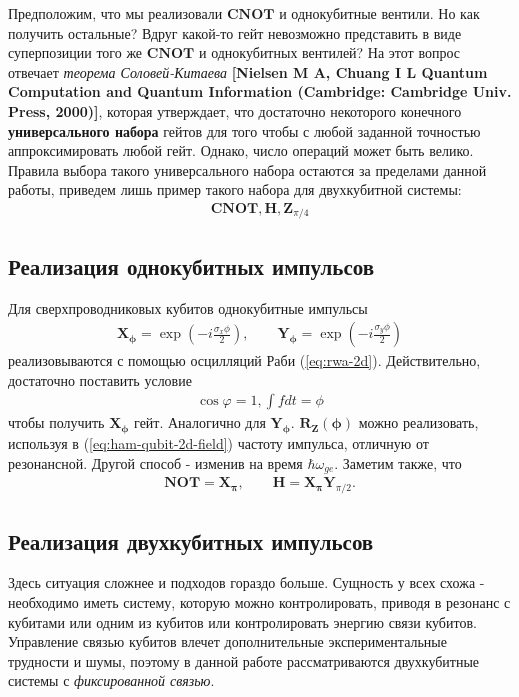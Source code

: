 \documentclass[12pt, twoside]{report}
\numberwithin{equation}{section}
\numberwithin{figure}{section}
\begin{document}
\newline
Предположим, что мы реализовали $\mathbf{CNOT}$ и однокубитные вентили. Но как получить остальные? Вдруг какой-то гейт невозможно представить в виде суперпозиции того же $\mathbf{CNOT}$ и однокубитных вентилей? На этот вопрос отвечает \textit{ теорема Соловей-Китаева} \textbf{[Nielsen M A, Chuang I L Quantum Computation and Quantum Information (Cambridge: Cambridge Univ. Press, 2000)]}, которая утверждает, что достаточно некоторого конечного \textbf{универсального набора} гейтов для того чтобы с любой заданной точностью аппроксимировать любой гейт. Однако, число операций может быть велико. Правила выбора такого универсального набора остаются за пределами данной работы, приведем лишь пример такого набора для двухкубитной системы: 
\begin{gather}
\mathbf{CNOT}, \mathbf{H}, \mathbf{Z}_{\pi/4}
\label{eq:universal-set} 
\end{gather}
\subsection{Реализация однокубитных импульсов}
Для сверхпроводниковых кубитов однокубитные импульсы 
\begin{gather}
\mathbf{X_\phi} = 
\exp \left(-i \frac{\sigma_x \phi}{2} \right), \quad \quad
\mathbf{Y_\phi} = 
\exp \left(-i \frac{\sigma_y \phi}{2} \right)
\end{gather}
реализовываются с помощью осцилляций Раби (\ref{eq:rwa-2d}). Действительно, достаточно поставить условие
\begin{gather*}
\cos \varphi = 1, \int f dt = \phi
\end{gather*}
чтобы получить $\mathbf{X_\phi}$ гейт. Аналогично для $\mathbf{Y_\phi}$.
$\mathbf{R_Z(\phi)}$ можно реализовать, используя в (\ref{eq:ham-qubit-2d-field}) частоту импульса, отличную от резонансной. Другой способ -  изменив на время $\hbar \omega_{ge}$. Заметим также, что 
\begin{gather*}
\mathbf{NOT} = \mathbf{X_\pi},\quad \quad \mathbf{H} = \mathbf{X_\pi}\mathbf{Y}_{\pi/2}.
\end{gather*} 
\subsection{Реализация двухкубитных импульсов}
Здесь ситуация сложнее и подходов гораздо больше. Сущность у всех схожа - необходимо иметь систему, которую можно контролировать, приводя в резонанс с кубитами или одним из кубитов или контролировать энергию связи кубитов. Управление связью кубитов влечет дополнительные экспериментальные трудности и шумы, поэтому в данной работе рассматриваются двухкубитные системы с \textit{фиксированной связью}. 
\end{document}
